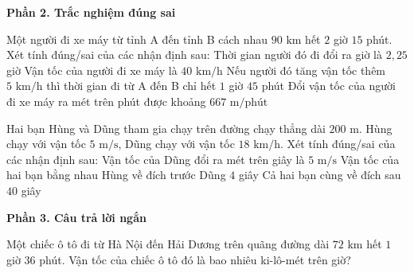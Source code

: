 \textbf{Phần 2. Trắc nghiệm đúng sai}

\begin{ex} %
Một người đi xe máy từ tỉnh A đến tỉnh B cách nhau $90\text{ km}$ hết $2$ giờ $15$ phút. Xét tính đúng/sai của các nhận định sau:
\choiceTF
{\True Thời gian người đó đi đổi ra giờ là $2{,}25$ giờ}
{\True Vận tốc của người đi xe máy là $40\text{ km/h}$}
{Nếu người đó tăng vận tốc thêm $5\text{ km/h}$ thì thời gian đi từ A đến B chỉ hết $1$ giờ $45$ phút}
{\True Đổi vận tốc của người đi xe máy ra mét trên phút được khoảng $667\text{ m/phút}$}
\end{ex}

\begin{ex} %
Hai bạn Hùng và Dũng tham gia chạy trên đường chạy thẳng dài $200\text{ m}$. Hùng chạy với vận tốc $5\text{ m/s}$, Dũng chạy với vận tốc $18\text{ km/h}$. Xét tính đúng/sai của các nhận định sau:
\choiceTF
{\True Vận tốc của Dũng đổi ra mét trên giây là $5\text{ m/s}$}
{\True Vận tốc của hai bạn bằng nhau}
{Hùng về đích trước Dũng $4$ giây}
{\True Cả hai bạn cùng về đích sau $40$ giây}
\end{ex}

\textbf{Phần 3. Câu trả lời ngắn}

\begin{ex} %
Một chiếc ô tô đi từ Hà Nội đến Hải Dương trên quãng đường dài $72\text{ km}$ hết $1$ giờ $36$ phút. Vận tốc của chiếc ô tô đó là bao nhiêu ki-lô-mét trên giờ?
\end{ex}

